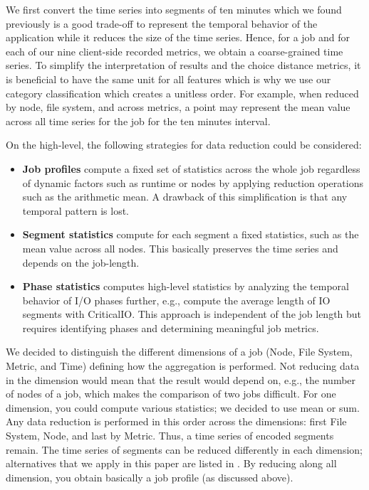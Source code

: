 \documentclass{jhps}
\begin{document}
We first convert the time series into segments of ten minutes which we found previously is a good trade-off to represent the temporal behavior of the application while it reduces the size of the time series.
Hence, for a job and for each of our nine client-side recorded metrics, we obtain a coarse-grained time series.
To simplify the interpretation of results and the choice distance metrics, it is beneficial to have the same unit for all features which is why we use our category classification which creates a unitless order.
For example, when reduced by node, file system, and across metrics, a point may represent the mean value across all time series for the job for the ten minutes interval.

On the high-level, the following strategies for data reduction could be considered:
\begin{itemize}
	\item \textbf{Job profiles} compute a fixed set of statistics across the whole job regardless of dynamic factors such as runtime or nodes by applying reduction operations such as the arithmetic mean.
		A drawback of this simplification is that any temporal pattern is lost.
	\item \textbf{Segment statistics} compute for each segment a fixed statistics, such as the mean value across all nodes.
		This basically preserves the time series and depends on the job-length.
	\item \textbf{Phase statistics} computes high-level statistics by analyzing the temporal behavior of I/O phases further, e.g., compute the average length of IO segments with CriticalIO.
		This approach is independent of the job length but requires identifying phases and determining meaningful job metrics.
\end{itemize}

We decided to distinguish the different dimensions of a job (Node, File System, Metric, and Time) defining how the aggregation is performed.
Not reducing data in the dimension would mean that the result would depend on, e.g., the number of nodes of a job, which makes the comparison of two jobs difficult.
For one dimension, you could compute various statistics; we decided to use mean or sum.
Any data reduction is performed in this order across the dimensions: first File System, Node, and last by Metric.
Thus, a time series of encoded segments remain.
The time series of segments can be reduced differently in each dimension; alternatives that we apply in this paper are listed in .
By reducing along all dimension, you obtain basically a job profile (as discussed above).
\end{document}
